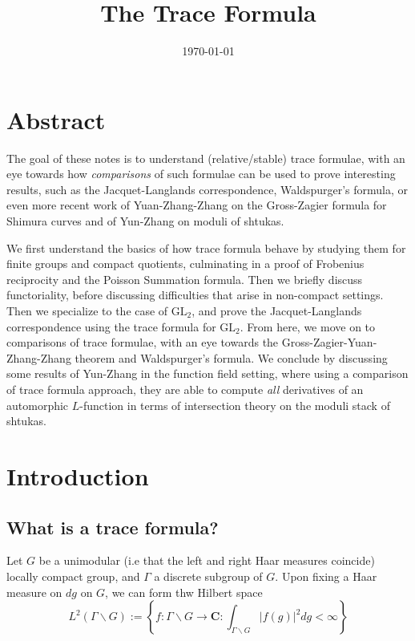 \documentclass[leqno,12pt,a4paper, openany]{amsbook}
\theoremstyle{definition}
\numberwithin{equation}{section}
\newcommand{\GL}{\text{GL}}
\newcommand{\BC}{\mathbf{C}}
\begin{document}
\title{The Trace Formula}
\date{\today}
\frontmatter
\maketitle{}


\chapter*{Abstract} 
The goal of these notes is to understand (relative/stable) trace formulae, with an eye towards how \emph{comparisons} of such formulae can be used to prove interesting results, such as the Jacquet-Langlands correspondence, Waldspurger's formula, or even more recent work of Yuan-Zhang-Zhang on the Gross-Zagier formula for Shimura curves and of Yun-Zhang on moduli of shtukas.

We first understand the basics of how trace formula behave by studying them for finite groups and compact quotients, culminating in a proof of Frobenius reciprocity and the Poisson Summation formula. Then we briefly discuss functoriality, before discussing difficulties that arise in non-compact settings. Then we specialize to the case of $\GL_2$, and prove the Jacquet-Langlands correspondence using 
the trace formula for $\GL_2$. From here, we move on to comparisons of trace formulae, with an eye towards the Gross-Zagier-Yuan-Zhang-Zhang theorem and Waldspurger's formula. We conclude by discussing some results of Yun-Zhang in the function field setting, where using a comparison of trace formula approach, they are able to compute \emph{all} derivatives of an automorphic $L$-function in terms of 
intersection theory on the moduli stack of shtukas. 



\tableofcontents{}



\mainmatter

\chapter{Introduction}

\section{What is a trace formula?}

Let $G$ be a unimodular (i.e that the left and right Haar measures coincide) locally compact group, and $\Gamma$ a discrete subgroup of $G$. Upon fixing a Haar measure on $dg$ on $G$, we can form thw Hilbert space \[ L^2(\Gamma \backslash G) := \left\{ f \colon \Gamma \backslash G \to \BC : \int_{\Gamma \backslash G} |f(g)|^2 dg < \infty  \right\} \]
\end{document}
